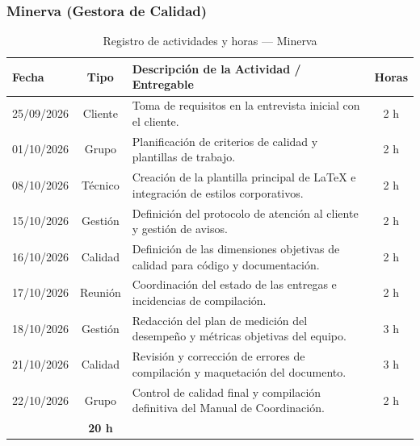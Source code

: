 \subsubsection{Minerva (Gestora de Calidad)}
\begin{table}[H]
\centering
\small
{}
\begin{tabularx}{\textwidth}{l c X c}
\toprule
\rowcolor{verdeApagado}
\textbf{\color{textoOscuro}Fecha} & \textbf{\color{textoOscuro}Tipo} & \textbf{\color{textoOscuro}Descripción de la Actividad / Entregable} & \textbf{\color{textoOscuro}Horas} \\
\midrule
25/09/2026 & Cliente & Toma de requisitos en la entrevista inicial con el cliente. & 2 h \\
01/10/2026 & Grupo & Planificación de criterios de calidad y plantillas de trabajo. & 2 h \\
08/10/2026 & Técnico & Creación de la plantilla principal de \LaTeX{} e integración de estilos corporativos. & 2 h \\
15/10/2026 & Gestión & Definición del protocolo de atención al cliente y gestión de avisos. & 2 h \\
16/10/2026 & Calidad & Definición de las dimensiones objetivas de calidad para código y documentación. & 2 h \\
17/10/2026 & Reunión & Coordinación del estado de las entregas e incidencias de compilación. & 2 h \\
18/10/2026 & Gestión & Redacción del plan de medición del desempeño y métricas objetivas del equipo. & 3 h \\
21/10/2026 & Calidad & Revisión y corrección de errores de compilación y maquetación del documento. & 3 h \\
22/10/2026 & Grupo & Control de calidad final y compilación definitiva del Manual de Coordinación. & 2 h \\
\midrule
\rowcolor{azulclaro!60}
\multicolumn{3}{l}{\textbf{\color{textoOscuro}Total Horas Dedicadas — Minerva:}} & \textbf{\color{textoOscuro}20 h} \\
\bottomrule
\end{tabularx}
\caption{Registro de actividades y horas — Minerva}
\end{table}


